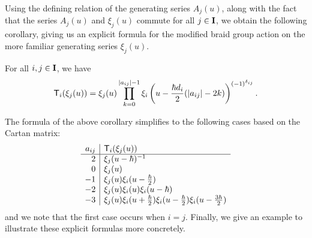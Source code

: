 Using the defining relation of the generating series $A_j(u)$, along with the fact that the series $A_j(u)$ and $\xi_j(u)$ commute for all $j\in\mathbf{I}$, we obtain the following corollary, giving us an explicit formula for the modified braid group action on the more familiar generating series $\xi_j(u)$.

\begin{corollary}\label{C:tau-xi}
    For all $i,j\in\mathbf{I}$, we have
    \[\mathsf{T}_i(\xi_j(u)) = \xi_j(u)\prod_{k=0}^{\lvert a_{ij}\rvert-1} \xi_i\left(u-\frac{\hbar d_i}{2}(\lvert a_{ij}\rvert-2k)\right)^{(-1)^{\delta_{ij}}}.\]
\end{corollary}

The formula of the above corollary simplifies to the following cases based on the Cartan matrix:
\[\begin{array}{r|l}
    a_{ij} & \mathsf{T}_i(\xi_j(u)) \\
    \hline
    2 & \xi_j(u-\hbar)^{-1} \\
    0 & \xi_j(u) \\
    -1 & \xi_j(u)\xi_i(u-\frac{\hbar}{2}) \\
    -2 & \xi_j(u)\xi_i(u)\xi_i(u-\hbar) \\
    -3 & \xi_j(u)\xi_i(u+\frac{\hbar}{2})\xi_i(u-\frac{\hbar}{2})\xi_i(u-\frac{3\hbar}{2})
\end{array}\]
and we note that the first case occurs when $i=j$.
Finally, we give an example to illustrate these explicit formulas more concretely.

